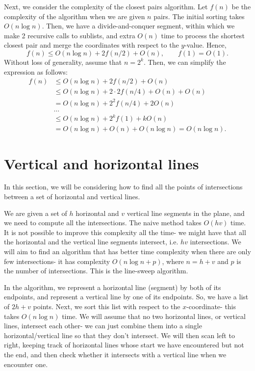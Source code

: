 \documentclass[a4paper, openany]{memoir}
\begin{document}
Next, we consider the complexity of the closest pairs algorithm. Let $f(n)$ be the complexity of the algorithm when we are given $n$ pairs. The initial sorting takes $O(n \log n)$. Then, we have a divide-and-conquer segment, within which we make 2 recursive calls to sublists, and extra $O(n)$ time to process the shortest closest pair and merge the coordinates with respect to the $y$-value. Hence,
\[f(n) \leq O(n \log n) + 2f(n/2) + O(n), \qquad f(1) = O(1).\]
Without loss of generality, assume that $n = 2^k$. Then, we can simplify the expression as follows:
\begin{align*}
    f(n) &\leq O(n \log n) + 2f(n/2) + O(n) \\
    &\leq O(n \log n) + 2 \cdot 2f(n/4) + O(n) + O(n) \\
    &= O(n \log n) + 2^2 f(n/4) + 2O(n) \\
    & \dots \\
    &\leq O(n \log n) + 2^kf(1) + kO(n) \\
    &= O(n \log n) + O(n) + O(n \log n) = O(n \log n).
\end{align*}

\newpage

\section{Vertical and horizontal lines}
In this section, we will be considering how to find all the points of intersections between a set of horizontal and vertical lines.

We are given a set of $h$ horizontal and $v$ vertical line segments in the plane, and we need to compute all the intersections. The naive method takes $O(hv)$ time. It is not possible to improve this complexity all the time- we might have that all the horizontal and the vertical line segments intersect, i.e. $hv$ intersections. We will aim to find an algorithm that has better time complexity when there are only few intersections- it has complexity $O(n \log n + p)$, where $n = h + v$ and $p$ is the number of intersections. This is the line-sweep algorithm.

In the algorithm, we represent a horizontal line (segment) by both of its endpoints, and represent a vertical line by one of its endpoints. So, we have a list of $2h + v$ points. Next, we sort this list with respect to the $x$-coordinate- this takes $O(n \log n)$ time. We will assume that no two horizontal lines, or vertical lines, intersect each other- we can just combine them into a single horizontal/vertical line so that they don't intersect. We will then scan left to right, keeping track of horizontal lines whose start we have encountered but not the end, and then check whether it intersects with a vertical line when we encounter one.
\end{document}
